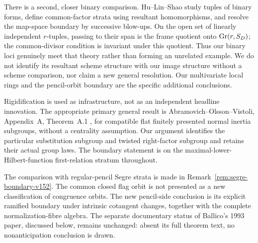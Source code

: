 \documentclass[11pt,reqno]{amsart}
\numberwithin{equation}{section}
\theoremstyle{definition}\newtheorem{definition}[theorem]{Definition}
\theoremstyle{remark}\newtheorem{remark}[theorem]{Remark}
\begin{document}
There is a second, closer binary comparison.  Hu--Lin--Shao
\cite[\S2.2, Corollary~3.6, and Theorem~1.1]{HuLinShao2007}
study tuples of binary forms, define common-factor strata using
resultant homomorphisms, and resolve the map-space boundary by
successive blow-ups.  On the open set of linearly independent
$r$-tuples, passing to their span is the frame quotient onto
$\operatorname{Gr}(r,S_D)$; the common-divisor condition is invariant under this
quotient.  Thus our binary loci genuinely meet that theory rather
than forming an unrelated example.  We do not identify its
resultant scheme structure with our image structure without a
scheme comparison, nor claim a new general resolution.  Our
multivariate local rings and the pencil-orbit boundary are the
specific additional conclusions.

Rigidification is used as infrastructure, not as an independent
headline innovation.  The appropriate primary general result is
Abramovich--Olsson--Vistoli, Appendix~A, Theorem~A.1
\cite{AOV2008}, for compatible flat finitely presented normal
inertia subgroups, without a centrality assumption.  Our argument
identifies the particular substitution subgroup and twisted
right-factor subgroup and retains their actual group laws.  The
boundary statement is on the maximal-lower-Hilbert-function
first-relation stratum throughout.

The comparison with regular-pencil Segre strata is made in
Remark~\ref{rem:segre-boundary-v152}.  The common closed flag orbit
is not presented as a new classification of congruence orbits.
The new pencil-side conclusion is its explicit ramified boundary
under intrinsic cotangent changes, together with the complete
normalization-fibre algebra.  The separate documentary status of
Ballico's 1993 paper, discussed below, remains unchanged: absent
its full theorem text, no nonanticipation conclusion is drawn.
\end{document}
